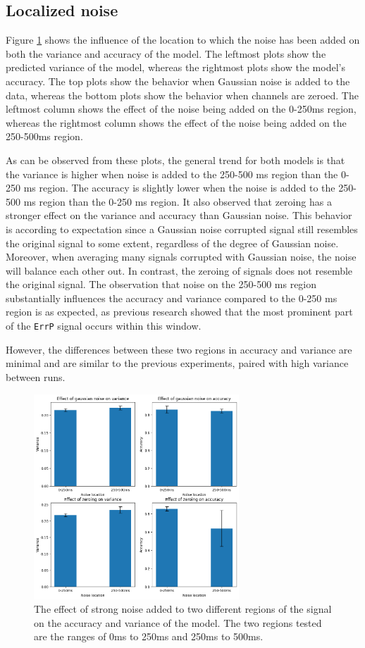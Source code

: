 \subsection{Localized noise}

Figure \ref{fig:local} shows the influence of the location to which the noise has been added on both the variance and accuracy of the model. The leftmost plots show the predicted variance of the model, whereas the rightmost plots show the model's accuracy. The top plots show the behavior when Gaussian noise is added to the data, whereas the bottom plots show the behavior when channels are zeroed. The leftmost column shows the effect of the noise being added on the 0-250ms region, whereas the rightmost column shows the effect of the noise being added on the 250-500ms region.

As can be observed from these plots, the general trend for both models is that the variance is higher when noise is added to the 250-500 ms region than the 0-250 ms region. The accuracy is slightly lower when the noise is added to the 250-500 ms region than the 0-250 ms region. It also observed that zeroing has a stronger effect on the variance and accuracy than Gaussian noise. This behavior is according to expectation since a Gaussian noise corrupted signal still resembles the original signal to some extent, regardless of the degree of Gaussian noise. Moreover, when averaging many signals corrupted with Gaussian noise, the noise will balance each other out. In contrast, the zeroing of signals does not resemble the original signal. The observation that noise on the 250-500 ms region substantially influences the accuracy and variance compared to the 0-250 ms region is as expected, as previous research showed that the most prominent part of the \verb|ErrP| signal occurs within this window. 

However, the differences between these two regions in accuracy and variance are minimal and are similar to the previous experiments, paired with high variance between runs.

\begin{figure}[!tbp]
    \centering
        \includegraphics[width=7.7cm]{img/local.png}
    \caption{The effect of strong noise added to two different regions of the signal on the accuracy and variance of the model. The two regions tested are the ranges of 0ms to 250ms and 250ms to 500ms.}
    \label{fig:local}
\end{figure}

